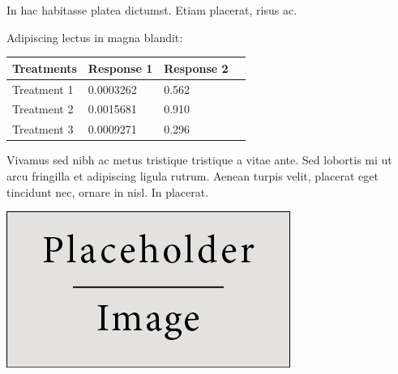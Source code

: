 \documentclass[a0,landscape]{a0poster}
\begin{document}
\begin{multicols}{4}
    In hac habitasse platea dictumst. Etiam placerat, risus ac.

    Adipiscing lectus in magna blandit:

    \begin{center}\vspace{1cm}
        \begin{tabular}{l l l l}
            \toprule
            \textbf{Treatments} & \textbf{Response 1} & \textbf{Response 2} \\
            \midrule
            Treatment 1         & 0.0003262           & 0.562               \\
            Treatment 2         & 0.0015681           & 0.910               \\
            Treatment 3         & 0.0009271           & 0.296               \\
            \bottomrule
        \end{tabular}
    \end{center}\vspace{1cm}

    Vivamus sed nibh ac metus tristique tristique a vitae ante. Sed lobortis mi ut arcu fringilla et adipiscing ligula rutrum. Aenean turpis velit, placerat eget tincidunt nec, ornare in nisl. In placerat.

    \begin{center}\vspace{1cm}
        \includegraphics[width=0.8\linewidth]{placeholder}
    \end{center}\vspace{1cm}



\end{multicols}
\end{document}
